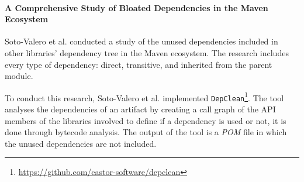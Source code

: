 \begin{comment}
\paragraph{Vulnerable Open Source Dependencies: Counting Those That Matter \cite{pashchenko2018vulnerable}} %
In this research, Pashchenko et al. propose a new method to count the dependencies of libraries. This method is used to analyze the dependencies of 200 libraries of the Maven ecosystem. With their method, they differentiate between libraries from the same project and third-party libraries. Furthermore, the dependencies that are not deployed in production (only used for testing or development purposes) are filtered out since these dependencies' vulnerabilities do not affect the final product. Furthermore, they consider the special case of halted dependencies, which are the ones that are not being actively developed. Vulnerabilities in halted dependencies suppose an important threat to the software projects that depend on these since the vulnerability will not be fixed.

One of the main contributions of this research is implementing the method defined in the paper to detect the vulnerabilities that, according to their definition, matter.

However, Pashchenko et al. do not perform a call-level analysis of the dependencies, since their dependency resolution is based only on the \textit{POM} file of the libraries. Hence, the transitive dependencies that are not really used in the studied library are still counted.
\end{comment}

\paragraph{A Comprehensive Study of Bloated Dependencies in the Maven Ecosystem \cite{soto2020comprehensive}}
Soto-Valero et al. conducted a study of the unused dependencies included in other libraries' dependency tree in the Maven ecosystem. The research includes every type of dependency: direct, transitive, and inherited from the parent module.

To conduct this research, Soto-Valero et al. implemented \texttt{DepClean}\footnote{\href{https://github.com/castor-software/depclean}{https://github.com/castor-software/depclean}}. The tool analyses the dependencies of an artifact by creating a call graph of the API members of the libraries involved to define if a dependency is used or not, it is done through bytecode analysis. The output of the tool is a \textit{POM} file in which the unused dependencies are not included.

